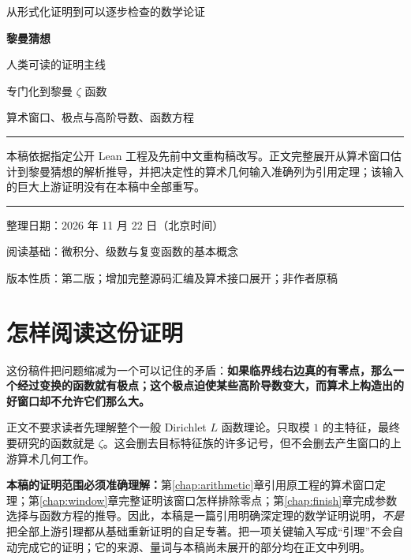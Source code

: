 \documentclass[UTF8,fontset=fandol,a4paper,openany,oneside]{ctexbook}
\theoremstyle{definition}
\theoremstyle{remark}
\begin{document}
\begin{titlepage}
\vspace*{17mm}
\begin{center}
{\Large 从形式化证明到可以逐步检查的数学论证\par}
\vspace{16mm}
{\Huge\bfseries 黎曼猜想\par}
\vspace{8mm}
{\LARGE 人类可读的证明主线\par}
\vspace{12mm}
{\large 专门化到黎曼 $\zeta$ 函数\par}
{\large 算术窗口、极点与高阶导数、函数方程\par}
\end{center}
\vspace{16mm}
\noindent\rule{\textwidth}{0.5pt}
\par\medskip
本稿依据指定公开 Lean 工程及先前中文重构稿改写。正文完整展开从算术窗口估计到黎曼猜想的解析推导，并把决定性的算术几何输入准确列为引用定理；该输入的巨大上游证明没有在本稿中全部重写。
\par\medskip
\noindent\rule{\textwidth}{0.5pt}
\vfill
\noindent 整理日期：2026 年 11 月 22 日（北京时间）\par
\noindent 阅读基础：微积分、级数与复变函数的基本概念\par
\noindent 版本性质：第二版；增加完整源码汇编及算术接口展开；非作者原稿\par
\end{titlepage}
\frontmatter
\chapter*{怎样阅读这份证明}
这份稿件把问题缩减为一个可以记住的矛盾：\textbf{如果临界线右边真的有零点，那么一个经过变换的函数就有极点；这个极点迫使某些高阶导数变大，而算术上构造出的好窗口却不允许它们那么大。}

正文不要求读者先理解整个一般 Dirichlet $L$ 函数理论。只取模 $1$ 的主特征，最终要研究的函数就是 $\zeta$。这会删去目标特征族的许多记号，但不会删去产生窗口的上游算术几何工作。

\textbf{本稿的证明范围必须准确理解：}第\ref{chap:arithmetic}章引用原工程的算术窗口定理；第\ref{chap:window}章完整证明该窗口怎样排除零点；第\ref{chap:finish}章完成参数选择与函数方程的推导。因此，本稿是一篇引用明确深定理的数学证明说明，\emph{不是}把全部上游引理都从基础重新证明的自足专著。把一项关键输入写成“引理”不会自动完成它的证明；它的来源、量词与本稿尚未展开的部分均在正文中列明。
\end{document}
